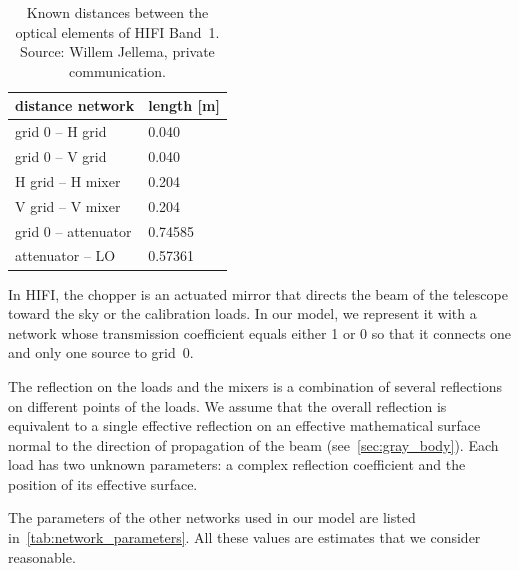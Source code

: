 \begin{table}
    \centering
    \begin{tabular}{ll}
        \toprule
        distance network     & length [\si{\meter}] \\
        \midrule
        grid 0 -- H grid     & \num{0.040}   \\
        grid 0 -- V grid     & \num{0.040}   \\
        H grid -- H mixer    & \num{0.204}   \\
        V grid -- V mixer    & \num{0.204}   \\
        grid 0 -- attenuator & \num{0.74585} \\
        attenuator -- LO     & \num{0.57361} \\
        \bottomrule
    \end{tabular}
    \caption{
        Known distances between the optical elements of HIFI Band~1.
        Source: Willem Jellema, private communication.
    }
    \label{tab:known_distances}
\end{table}

In HIFI, the chopper is an actuated mirror that directs the beam of the telescope toward the sky or the calibration loads.
In our model, we represent it with a network whose transmission coefficient equals either 1 or 0 so that it connects one and only one source to grid~0.

The reflection on the loads and the mixers is a combination of several reflections on different points of the loads.
We assume that the overall reflection is equivalent to a single effective reflection on an effective mathematical surface normal to the direction of propagation of the beam (see~\cref{sec:gray_body}).
Each load has two unknown parameters: a complex reflection coefficient and the position of its effective surface.

The parameters of the other networks used in our model are listed in~\cref{tab:network_parameters}.
All these values are estimates that we consider reasonable.

